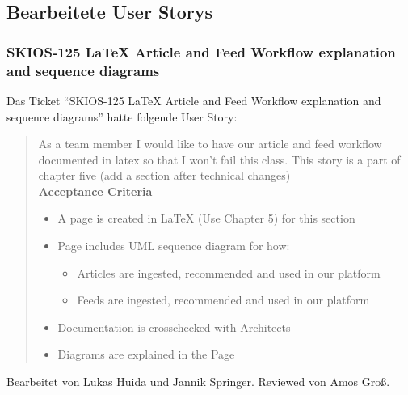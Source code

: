 \subsection{Bearbeitete User Storys}

\subsubsection{SKIOS-125 LaTeX Article and Feed Workflow explanation and sequence diagrams}
Das Ticket \enquote{SKIOS-125 LaTeX Article and Feed Workflow explanation and sequence diagrams} hatte folgende User Story:
\begin{quotation}
    As a team member I would like to have our article and feed workflow documented in latex so that I won't fail this class.
    This story is a part of chapter five (add a section after technical changes)\\
\textbf{Acceptance Criteria}
\begin{itemize}
    \item A page is created in LaTeX (Use Chapter 5) for this section
    \item Page includes UML sequence diagram for how:
    \begin{itemize}
        \item Articles are ingested, recommended and used in our platform
        \item Feeds are ingested, recommended and used in our platform
    \end{itemize}
    \item Documentation is crosschecked with Architects
    \item Diagrams are explained in the Page
\end{itemize}
\end{quotation}
Bearbeitet von Lukas Huida und Jannik Springer.
Reviewed von Amos Groß.


